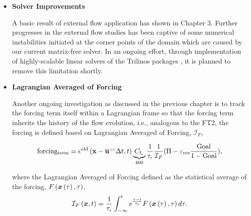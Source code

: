 \begin{itemize}
{  }
  \item \textbf{Solver Improvements} {

  A basic result of external flow application has shown in Chapter 3. Further progresses in the external flow studies has been captive of 
  some numerical instabilities initiated at the corner points of the domain which are caused by our current matrix-free solver. In an ongoing effort, through implementation of highly-scalable linear solvers of the Trilinos packages \cite{Trilinos-Tutorial, 1089021, Trilinos-Users-Guide, Trilinos-Dev-Guide-II, Trilinos-Dev-Guide, Trilinos-Overview}, it is planned to remove this limitation shortly.





  }
  \item \textbf{Lagrangian Averaged of Forcing} {



Another ongoing investigation as discussed in the previous chapter is to track the forcing term itself within a Lagrangian frame so that
the forcing term inherits the history of the flow evolution, i.e., analogous to the FT2, the forcing is defined 
based on Lagrangian Averaged of Forcing, ${\mathcal I}_{F}$, 

%

\begin{equation}
       {\rm  forcing_{term} } =
       \epsilon^{\rm old} \left( {\mathbf x}-\bareps[{\mathbf u}] \Delta t,t\right)
       \underbrace{C_{{\rm f}_{\epsilon}}}_{400}   %
       \frac 1 {\tau_{\epsilon}}
       \frac {1}{{\mathcal I}_{F}}
       ( \Pi - \varepsilon_{\rm res}  \frac {\rm Goal}{1-{\rm Goal}} ),
\end{equation}


where the Lagrangian Averaged of Forcing defined as the statistical average of the forcing, $F \left(\mbox{\boldmath $x$}\left(\tau\right),\tau\right)$,
\begin{equation}
{\mathcal I}_{F}\left(\bx,t\right)  =
              {1 \over \tau_{\epsilon}} \int_{-\infty}^{t}
              e^{\frac{\tau-t}{\tau_{\epsilon}}} %
                  F \left(\bx\left(\tau\right),\tau\right)
                  d \tau.
\end{equation}

}
\end{itemize}

